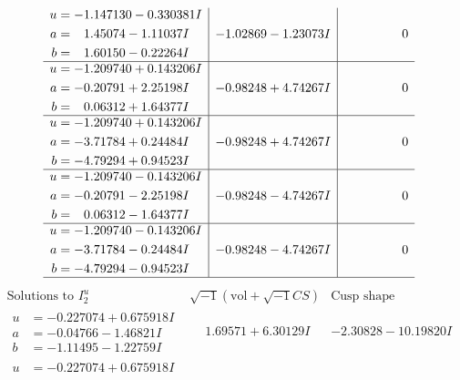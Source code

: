 \documentclass[1p]{elsarticle_modified}
\theoremstyle{definition}
\newcommand{\I}{\sqrt{-1}}
\begin{document}
$$\begin{array}{c|c|c}
\begin{aligned}
u &= -1.147130 - 0.330381 I \\
a &= \phantom{-}1.45074 - 1.11037 I \\
b &= \phantom{-}1.60150 - 0.22264 I\end{aligned}
 & -1.02869 - 1.23073 I & \phantom{-0.000000 } 0 \\ \hline\begin{aligned}
u &= -1.209740 + 0.143206 I \\
a &= -0.20791 + 2.25198 I \\
b &= \phantom{-}0.06312 + 1.64377 I\end{aligned}
 & -0.98248 + 4.74267 I & \phantom{-0.000000 } 0 \\ \hline\begin{aligned}
u &= -1.209740 + 0.143206 I \\
a &= -3.71784 + 0.24484 I \\
b &= -4.79294 + 0.94523 I\end{aligned}
 & -0.98248 + 4.74267 I & \phantom{-0.000000 } 0 \\ \hline\begin{aligned}
u &= -1.209740 - 0.143206 I \\
a &= -0.20791 - 2.25198 I \\
b &= \phantom{-}0.06312 - 1.64377 I\end{aligned}
 & -0.98248 - 4.74267 I & \phantom{-0.000000 } 0 \\ \hline\begin{aligned}
u &= -1.209740 - 0.143206 I \\
a &= -3.71784 - 0.24484 I \\
b &= -4.79294 - 0.94523 I\end{aligned}
 & -0.98248 - 4.74267 I & \phantom{-0.000000 } 0\\
 \hline 
 \end{array}$$\newpage$$\begin{array}{c|c|c}  
\text{Solutions to }I^u_{2}& \I (\text{vol} + \sqrt{-1}CS) & \text{Cusp shape}\\
 \hline 
\begin{aligned}
u &= -0.227074 + 0.675918 I \\
a &= -0.04766 - 1.46821 I \\
b &= -1.11495 - 1.22759 I\end{aligned}
 & \phantom{-}1.69571 + 6.30129 I & -2.30828 - 10.19820 I \\ \hline\begin{aligned}
u &= -0.227074 + 0.675918 I \\

\end{aligned}
\end{array}$$
\end{document}

